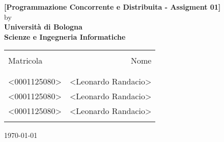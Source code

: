 \documentclass[12pt, a4paper]{report}
\begin{document}
\renewcommand\bibname{References} %


\begin{titlepage}

\begin{center}

\vspace{3em}%
\Large \textbf {[Programmazione Concorrente e Distribuita - Assigment 01]}\\%
\vspace{1em}%
\normalsize by \\%
\vspace{1em}
{\bf Università di Bologna \\ Scienze e Ingegneria Informatiche}\\[0.5in]

       
 \begin{table}[h]
 \centering
 \begin{tabular}{lr}\hline \\
 Matricola & Nome \\ \\ \hline
 \\
 <0001125080> & <Leonardo Randacio> \\
 <0001125080> & <Leonardo Randacio> \\ 
 <0001125080> & <Leonardo Randacio> \\ \\ \hline 
 \end{tabular}
 \end{table}


\vfill

\today

\end{center}

\end{titlepage}


\tableofcontents
\listoffigures
\listoftables

\newpage
{} %



\end{document}
